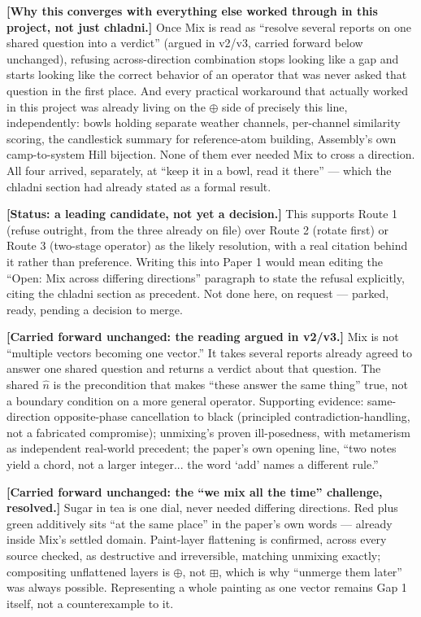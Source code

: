 \documentclass[11pt]{article}
\begin{document}
\textbf{[Why this converges with everything else worked through in
this project, not just chladni.]} Once Mix is read as ``resolve
several reports on one shared question into a verdict'' (argued in
v2/v3, carried forward below unchanged), refusing across-direction
combination stops looking like a gap and starts looking like the
correct behavior of an operator that was never asked that question in
the first place. And every practical workaround that actually worked
in this project was already living on the $\oplus$ side of precisely
this line, independently: bowls holding separate weather channels,
per-channel similarity scoring, the candlestick summary for
reference-atom building, Assembly's own camp-to-system Hill bijection.
None of them ever needed Mix to cross a direction. All four arrived,
separately, at ``keep it in a bowl, read it there'' --- which the
chladni section had already stated as a formal result.

\textbf{[Status: a leading candidate, not yet a decision.]} This
supports Route 1 (refuse outright, from the three already on file)
over Route 2 (rotate first) or Route 3 (two-stage operator) as the
likely resolution, with a real citation behind it rather than
preference. Writing this into Paper 1 would mean editing the
``Open: Mix across differing directions'' paragraph to state the
refusal explicitly, citing the chladni section as precedent. Not done
here, on request --- parked, ready, pending a decision to merge.

\textbf{[Carried forward unchanged: the reading argued in v2/v3.]} Mix
is not ``multiple vectors becoming one vector.'' It takes several
reports already agreed to answer one shared question and returns a
verdict about that question. The shared $\hat n$ is the precondition
that makes ``these answer the same thing'' true, not a boundary
condition on a more general operator. Supporting evidence: same-
direction opposite-phase cancellation to black (principled
contradiction-handling, not a fabricated compromise); unmixing's
proven ill-posedness, with metamerism as independent real-world
precedent; the paper's own opening line, ``two notes yield a chord,
not a larger integer... the word `add' names a different rule.''

\textbf{[Carried forward unchanged: the ``we mix all the time''
challenge, resolved.]} Sugar in tea is one dial, never needed
differing directions. Red plus green additively sits ``at the same
place'' in the paper's own words --- already inside Mix's settled
domain. Paint-layer flattening is confirmed, across every source
checked, as destructive and irreversible, matching unmixing exactly;
compositing unflattened layers is $\oplus$, not $\boxplus$, which is
why ``unmerge them later'' was always possible. Representing a whole
painting as one vector remains Gap 1 itself, not a counterexample to
it.
\end{document}
